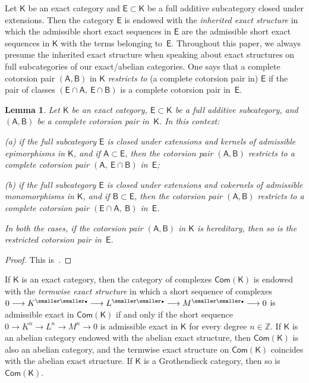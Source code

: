 \documentclass[12pt,a4paper]{amsart}
\newcommand{\+}{\nobreakdash-}
\renewcommand{\:}{\colon}
\newcommand{\rarrow}{\longrightarrow}
\newcommand{\bu}{{\text{\smaller\smaller$\scriptstyle\bullet$}}}
\newcommand{\sA}{\mathsf A}
\newcommand{\sB}{\mathsf B}
\newcommand{\sE}{\mathsf E}
\newcommand{\sK}{\mathsf K}
\newcommand{\Com}{\mathsf{Com}}
\newcommand{\boZ}{\mathbb Z}
\theoremstyle{plain}
\newtheorem{lem}[thm]{Lemma}
\theoremstyle{definition}
\begin{document}
 Let $\sK$ be an exact category and $\sE\subset\sK$ be a full
additive subcategory closed under extensions.
 Then the category $\sE$ is endowed with the \emph{inherited exact
structure} in which the admissible short exact sequences in $\sE$ are
the admissible short exact sequences in $\sK$ with the terms belonging
to~$\sE$.
 Throughout this paper, we always presume the inherited exact structure
when speaking about exact structures on full subcategories of our
exact/abelian categories.
 One says that a complete cotorsion pair $(\sA,\sB)$ in $\sK$
\emph{restricts to} (a complete cotorsion pair in) $\sE$ if the pair
of classes $(\sE\cap\sA,\>\sE\cap\sB)$ is a complete cotorsion pair
in~$\sE$.

\begin{lem} \label{restricting-cotorsion-pair-lemma}
 Let\/ $\sK$ be an exact category, $\sE\subset\sK$ be a full additive
subcategory, and $(\sA,\sB)$ be a complete cotorsion pair in\/~$\sK$.
 In this context: \par
\textup{(a)} if the full subcategory\/ $\sE$ is closed under extensions
and kernels of admissible epimorphisms in\/ $\sK$, and if\/
$\sA\subset\sE$, then the cotorsion pair $(\sA,\sB)$ restricts to
a complete cotorsion pair $(\sA,\>\sE\cap\sB)$ in\/~$\sE$; \par
\textup{(b)} if the full subcategory\/ $\sE$ is closed under extensions
and cokernels of admissible monomorphisms in\/ $\sK$, and if\/
$\sB\subset\sE$, then the cotorsion pair $(\sA,\sB)$ restricts to
a complete cotorsion pair $(\sE\cap\sA,\>\sB)$ in\/~$\sE$. \par
 In both the cases, if the cotorsion pair $(\sA,\sB)$ in\/ $\sK$ is
hereditary, then so is the restricted cotorsion pair in\/~$\sE$.
\end{lem}

\begin{proof}
 This is~\cite[Lemmas~1.5 and~1.6]{Pal}.
\end{proof}

 If $\sK$ is an exact category, then the category of complexes
$\Com(\sK)$ is endowed with the \emph{termwise exact structure} in
which a short sequence of complexes $0\rarrow K^\bu\rarrow L^\bu
\rarrow M^\bu\rarrow0$ is admissible exact in $\Com(\sK)$ if and only
if the short sequence $0\rarrow K^n\rarrow L^n\rarrow M^n\rarrow0$
is admissible exact in $\sK$ for every degree $n\in\boZ$.
 If $\sK$ is an abelian category endowed with the abelian exact
structure, then $\Com(\sK)$ is also an abelian category, and
the termwise exact structure on $\Com(\sK)$ coincides with the abelian
exact structure.
 If $\sK$ is a Grothendieck category, then so is $\Com(\sK)$.
\end{document}
